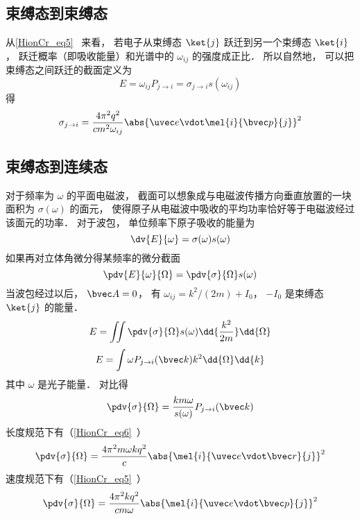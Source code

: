 
\begin{issues}
\issueDraft
\end{issues}


\subsection{束缚态到束缚态}
从\autoref{HionCr_eq5}~ 来看， 若电子从束缚态 $\ket{j}$ 跃迁到另一个束缚态 $\ket{i}$， 跃迁概率（即吸收能量）和光谱中的 $\omega_{ij}$ 的强度成正比． 所以自然地， 可以把束缚态之间跃迁的截面定义为
\begin{equation}
E = \omega_{ij}P_{j\to i} = \sigma_{j\to i} s(\omega_{ij})
\end{equation}
得 %
\begin{equation}
\sigma_{j\to i} = \frac{4\pi^2 q^2}{c m^2 \omega_{ij}} \abs{\uvec e \vdot\mel{i}{\bvec p}{j}}^2
\end{equation}

\subsection{束缚态到连续态}
对于频率为 $\omega$ 的平面电磁波， 截面可以想象成与电磁波传播方向垂直放置的一块面积为 $\sigma(\omega)$ 的面元， 使得原子从电磁波中吸收的平均功率恰好等于电磁波经过该面元的功率． 对于波包， 单位频率下原子吸收的能量为
\begin{equation}
\dv{E}{\omega} = \sigma(\omega) s(\omega)
\end{equation}
如果再对立体角微分得某频率的微分截面 %
\begin{equation}
\pdv{E}{\omega}{\Omega} = \pdv{\sigma}{\Omega} s(\omega)
\end{equation}
当波包经过以后， $\bvec A = 0$， 有 $\omega_{ij} = k^2/(2m) + I_0$， $-I_0$ 是束缚态 $\ket{j}$ 的能量．
\begin{equation}
E = \iint \pdv{\sigma}{\Omega} s(\omega) \dd{\frac{k^2}{2m}}\dd{\Omega}
\end{equation}
\begin{equation}
E = \int \omega P_{j\to i}(\bvec k) k^2\dd{\Omega}\dd{k}
\end{equation}
其中 $\omega$ 是光子能量． 对比得
\begin{equation}
\pdv{\sigma}{\Omega} = \frac{km \omega}{s(\omega)} P_{j\to i}(\bvec k)
\end{equation}
长度规范下有（\autoref{HionCr_eq6}~）
\begin{equation}
\pdv{\sigma}{\Omega} = \frac{4\pi^2 m\omega k q^2}{c} \abs{\mel{i}{\uvec e \vdot\bvec r}{j}}^2
\end{equation}
速度规范下有（\autoref{HionCr_eq5}~）
\begin{equation}\label{SIcros_eq8} %
\pdv{\sigma}{\Omega} = \frac{4\pi^2 k q^2}{c m \omega} \abs{\mel{i}{\uvec e \vdot \bvec p}{j}}^2
\end{equation}
